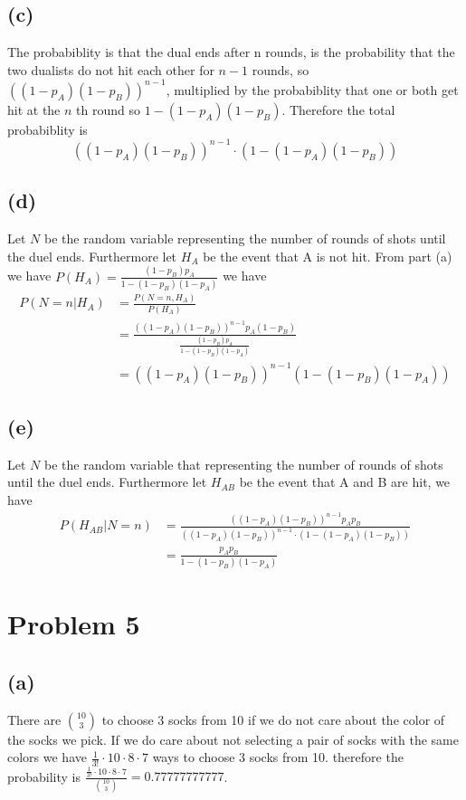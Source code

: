 \subsection*{(c)}
The probabiblity is that the dual ends after n rounds, is the probability
that the two dualists do not hit each other for $n-1$ rounds, so $\left((1-p_A)(1-p_B)\right)^{n-1}$,
multiplied by the probabiblity that one or both get hit at the $n$ th round
so $1-(1-p_A)(1-p_B)$. Therefore the total probabiblity is 
$$\boxed{\left((1-p_A)(1-p_B)\right)^{n-1}\cdot(1-(1-p_A)(1-p_B))}$$
\subsection*{(d)}
Let $N$ be the random variable representing the number of rounds
of shots until the duel ends. Furthermore let $H_A$ be the event that A is not hit. 
From part (a) we have $P(H_A)=\frac{(1-p_B)p_A}{1-(1-p_B)(1-p_A)}$
we have
\begin{align*}
    P(N=n|H_A)&=\frac{P(N=n,H_A)}{P(H_A)}\\
    &=\frac{\left((1-p_A)(1-p_B)\right)^{n-1}p_A(1-p_B)}{\frac{(1-p_B)p_A}{1-(1-p_B)(1-p_A)}}\\
    &=\boxed{\left((1-p_A)(1-p_B)\right)^{n-1}\left(1-(1-p_B)(1-p_A)\right)}
\end{align*}
\subsection*{(e)}
Let $N$ be the random variable that representing the number of rounds
of shots until the duel ends. Furthermore let $H_{AB}$ be the event that A and B are hit, we have
\begin{align*}
    P(H_{AB}|N=n)&=\frac{\left((1-p_A)(1-p_B)\right)^{n-1}p_Ap_B}{\left((1-p_A)(1-p_B)\right)^{n-1}\cdot(1-(1-p_A)(1-p_B))}\\
    &=\boxed{\frac{p_Ap_B}{1-(1-p_B)(1-p_A)}}
\end{align*}

\section*{Problem 5}
\subsection*{(a)}
There are $10\choose 3$ to choose 3 socks from 10 if we do not
care about the color of the socks we pick. If we do care about
not selecting a pair of socks with the same colors we have
$\frac{1}{3!}\cdot 10\cdot 8 \cdot 7$ ways to choose 3 socks from 10.
therefore the probability is $\frac{\frac{1}{3!}\cdot 10\cdot 8 \cdot 7}{{10\choose 3}}=\boxed{0.77777777777}$.
